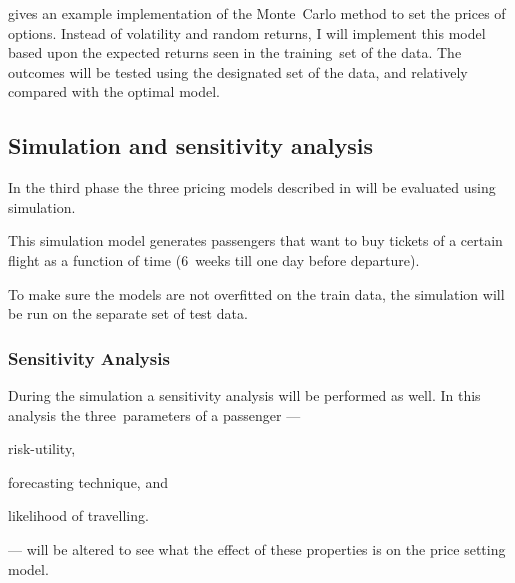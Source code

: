  gives an example implementation of the Monte~Carlo method to set the prices of options. Instead of volatility and random returns, I will implement this model based upon the expected returns seen in the training~set of the data. The outcomes will be tested using the designated set of the data, and relatively compared with the optimal model.


\subsection{Simulation and sensitivity analysis}
\label{subsec:SimulationAndSensitivityAnalysis}
In the third phase the three pricing models described in  will be evaluated using simulation.

This simulation model generates passengers that want to buy tickets of a certain flight as a function of time (6~weeks till one day before departure). 

To make sure the models are not overfitted on the train data, the simulation will be run on the separate set of test data.

\subsubsection{Sensitivity Analysis}
During the simulation a sensitivity analysis will be performed as well. In this analysis the three~parameters of a passenger --- \begin{inparaenum}
\item risk-utility,
\item forecasting technique, and
\item likelihood of travelling.
\end{inparaenum} --- will be altered to see what the effect of these properties is on the price setting model.

